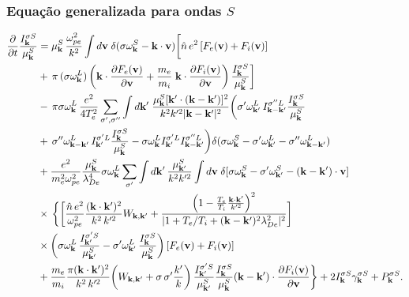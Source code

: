 \documentclass[10pt,aspectratio=1610,lualatex]{beamer}
\begin{document}
\begin{frame}
  \frametitle{Equação generalizada para ondas $S$}
  \vspace{-0.95cm}
  \begin{equation*}
    \begin{split}
      \frac{\partial}{\partial t}\frac{I_{\bf k}^{\sigma S}}{\mu_{\bf k}^S}
      &=\mu_{\bf k}^S\,\frac{\omega_{pe}^2}{k^2} \int d{\bf v}\;
      \delta(\sigma\omega_{\bf k}^S-{\bf k}\cdot{\bf v})
      \biggl[\hat{n}\,e^2\,[F_e({\bf v})+F_i({\bf v})]\\
      &+\,\pi\,(\sigma\omega_{\bf k}^L)\,\biggl({\bf k}\cdot
      \frac{\partial F_e({\bf v})}{\partial{\bf v}}
      +\frac{m_e}{m_i}\;{\bf k}\cdot
      \frac{\partial F_i({\bf v})}{\partial{\bf v}}\biggr)\,
      \frac{I_{\bf k}^{\sigma S}}{\mu_{\bf k}^S}\biggr]\\
      &-\,\pi\sigma\omega_{\bf k}^L\,\frac{e^2}{4T_e^2}
      \sum_{\sigma ',\sigma ''}\int d{\bf k'}\;
      \frac{\mu_{\bf k}^S[{\bf k}'\cdot({\bf k}-{\bf k}')]^2}
      {k^2k'^2|{\bf k}-{\bf k}'|^2} \biggl(\sigma '\omega_{{\bf k}'}^L\,
      I_{{\bf k}-{\bf k}'}^{\sigma ''L}
      \frac{I_{\bf k}^{\sigma S}}{\mu_{\bf k}^S}\\
      &+\,\sigma ''\omega_{{\bf k}-{\bf k}'}^L \,I_{{\bf k}'}^{\sigma 'L}
      \frac{I_{\bf k}^{\sigma S}}{\mu_{\bf k}^S}-\sigma\omega_{\bf k}^L
      I_{{\bf k}'}^{\sigma 'L} I_{{\bf k}-{\bf k}'}^{\sigma ''L}\biggr)
      \delta(\sigma\omega_{\bf k}^S-\sigma '\omega_{{\bf k}'}^L
      -\sigma ''\omega_{{\bf k}-{\bf k}'}^L)\\
      &+\frac{e^2}{m_e^2\omega_{pe}^2}\frac{\mu_{\bf k}^S}{\lambda_{De}^4}
          \sigma\omega_{\bf k}^L\sum_{\sigma '}\int d{\bf k'}\,
      \frac{\mu_{{\bf k}'}^S}{k^2k'^2}\int d{\bf v}\;
      \delta[\sigma\omega_{\bf k}^S-\sigma '\omega_{{\bf k}'}^S
      -({\bf k}-{\bf k}')\cdot{\bf v}]\\
      &\times\,\biggl\{\biggl[\frac{\hat{n}\,e^2}{\omega_{pe}^2}
      \frac{({\bf k}\cdot{\bf k}')^2}{k^2\,k'^2}W_{{\bf k},{\bf k}'}
      +\frac{\left(1-\frac{T_e}{T_i}\frac{\bf k \cdot k'}{k'^2}\right)^2}
      {|1+T_e/T_i+({\bf k - k'})^2 \lambda_{De}^2|^2}\biggr]\\
      &\times\biggl(\sigma\omega_{\bf k}^L\,
      \frac{I_{{\bf k}'}^{\sigma 'S}}{\mu_{{\bf k}'}^S} -\sigma
      '\omega_{{\bf k}'}^L\, \frac{I_{\bf k}^{\sigma S}}{\mu_{\bf k}^S}\biggr)
      \,[F_e({\bf v})+F_i({\bf v})]\\
      &+\frac{m_e}{m_i}\frac{\pi({\bf k}\cdot{\bf k}')^2}{k^2\,k'^2}
      \biggl(W_{{\bf k},{\bf k}'}+\sigma\,\sigma '\frac{k'}{k}\biggr)
      \,\frac{I_{{\bf k}'}^{\sigma 'S}}{\mu_{{\bf k}'}^S}
      \frac{I_{\bf k}^{\sigma S}}{\mu_{\bf k}^S}({\bf k}-{\bf k}')
      \cdot\frac{\partial F_i({\bf v})}{\partial{\bf v}}\biggr\}
      +2I_{\bf k}^{\sigma S} \gamma_{\bf k}^{\sigma S}+P_{\bf k}^{\sigma S}.
    \end{split}
  \end{equation*}
\end{frame}
\end{document}
